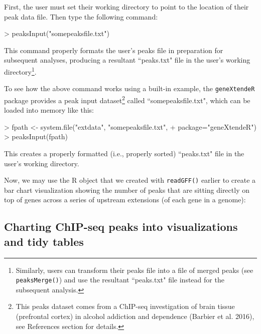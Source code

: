 \documentclass[12pt]{article}
\begin{document}
First, the user must set their working directory to point to the location of their peak data file.  Then type the following command:

\begin{Schunk}
\begin{Sinput}
> peaksInput("somepeaksfile.txt")
\end{Sinput}
\end{Schunk}

This command properly formats the user's peaks file in preparation for subsequent analyses, producing a resultant ``peaks.txt" file in the user's working directory\footnote{Similarly, users can transform their peaks file into a file of merged peaks (see \texttt{peaksMerge()}) and use the resultant ``peaks.txt" file instead for the subsequent analysis.}.

To see how the above command works using a built-in example, the \texttt{geneXtendeR} package provides a peak input dataset\footnote{This peaks dataset comes from a ChIP-seq investigation of brain tissue (prefrontal cortex) in alcohol addiction and dependence (Barbier et al. 2016), see References section for details.} called ``somepeaksfile.txt", which can be loaded into memory like this:

\begin{Schunk}
\begin{Sinput}
> fpath <- system.file("extdata", "somepeaksfile.txt", 
+                      package="geneXtendeR")
> peaksInput(fpath)
\end{Sinput}
\end{Schunk}

This creates a properly formatted (i.e., properly sorted) ``peaks.txt" file in the user's working directory.

Now, we may use the R object that we created with \texttt{readGFF()} earlier to create a bar chart visualization showing the number of peaks that are sitting directly on top of genes across a series of upstream extensions (of each gene in a genome):

\subsection{Charting ChIP-seq peaks into visualizations and tidy tables}
\end{document}
